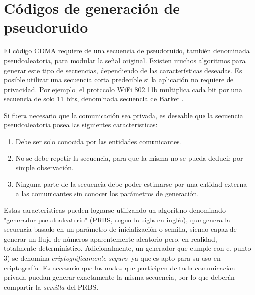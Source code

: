 \section{Códigos de generación de pseudoruido}
\label{PRNGs} 
El código CDMA requiere de una secuencia de pseudoruido, también denominada pseudoaleatoria, para modular la señal original. Existen muchos algoritmos para generar este tipo de secuencias, dependiendo de las características deseadas. Es posible utilizar una secuencia corta predecible si la aplicación no requiere de privacidad. Por ejemplo, el protocolo WiFi 802.11b multiplica cada bit por una secuencia de solo 11 bits, denominada secuencia de Barker \cite{mikulka2007cck}.

Si fuera necesario que la comunicación sea privada, es deseable que la secuencia pseudoaleatoria posea las siguientes características:

\begin{enumerate}
 \item Debe ser solo conocida por las entidades comunicantes.
 \item No se debe repetir la secuencia, para que la misma no se pueda deducir por simple observación.
 \item Ninguna parte de la secuencia debe poder estimarse por una entidad externa a las comunicantes sin conocer los parámetros de generación.
\end{enumerate}

 Estas caracteristicas pueden lograrse utilizando un algoritmo denominado "generador pseudoaleatorio" (PRBS, segun la sigla en inglés), que genera la secuencia basado en un parámetro de inicialización o semilla, siendo capaz de generar un flujo de números aparentemente aleatorio pero, en realidad, totalmente determinístico. Adicionalmente, un generador que cumple con el punto 3) se denomina \textit{criptográficamente seguro}, ya que es apto para su uso en criptografía. Es necesario que los nodos que participen de toda comunicación privada puedan generar exactamente la misma secuencia, por lo que deberán compartir la \textit{semilla} del PRBS.

